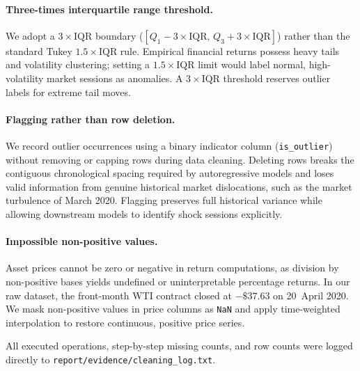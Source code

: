 \paragraph{Three-times interquartile range threshold.}
We adopt a $3\times\text{IQR}$ boundary ($[Q_1 - 3\times\text{IQR},\, Q_3 + 3\times\text{IQR}]$) rather than the standard Tukey $1.5\times\text{IQR}$ rule. Empirical financial returns possess heavy tails and volatility clustering; setting a $1.5\times\text{IQR}$ limit would label normal, high-volatility market sessions as anomalies. A $3\times\text{IQR}$ threshold reserves outlier labels for extreme tail moves.

\paragraph{Flagging rather than row deletion.}
We record outlier occurrences using a binary indicator column (\texttt{is\_outlier}) without removing or capping rows during data cleaning. Deleting rows breaks the contiguous chronological spacing required by autoregressive models and loses valid information from genuine historical market dislocations, such as the market turbulence of March 2020. Flagging preserves full historical variance while allowing downstream models to identify shock sessions explicitly.

\paragraph{Impossible non-positive values.}
Asset prices cannot be zero or negative in return computations, as division by non-positive bases yields undefined or uninterpretable percentage returns. In our raw dataset, the front-month WTI contract closed at $-\$37.63$ on 20~April 2020. We mask non-positive values in price columns as \texttt{NaN} and apply time-weighted interpolation to restore continuous, positive price series.

All executed operations, step-by-step missing counts, and row counts were logged directly to \texttt{report/evidence/cleaning\_log.txt}.
